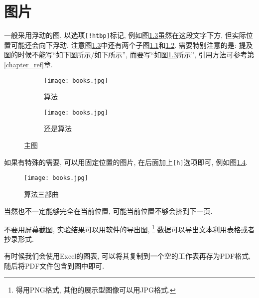\chapter{图片}

  一般采用浮动的图, 以选项\texttt{[!htbp]}标记, 例如图\ref{fig:algorithm}虽然在这段文字下方, 
但实际位置可能还会向下浮动. 注意图\ref{fig:algorithm}中还有两个子图\ref{fig:algorithm:a}和\ref{fig:algorithm:b}. 需要特别注意的是: 提及图的时候不能写``如下图所示/如下所示'', 
而要写``如图\ref{fig:algorithm}所示'', 引用方法可参考第\ref{chapter_ref}章.

\begin{figure}[!htbp]
\centering
\begin{subfigure}[t]{.3\textwidth}
  \centering
  \texttt{[image: books.jpg]}
  \caption{算法}
  \label{fig:algorithm:a}
\end{subfigure}
\quad
\begin{subfigure}[t]{.3\textwidth}
  \centering
  \texttt{[image: books.jpg]}
  \caption{还是算法}
  \label{fig:algorithm:b}
\end{subfigure}
\caption{主图}
\label{fig:algorithm}
\end{figure}


  如果有特殊的需要, 可以用固定位置的图片, 在后面加上\texttt{[h]}选项即可, 例如图\ref{fig:books}.

\begin{figure}[h]
    \centering
    \texttt{[image: books.jpg]}
    \caption{算法三部曲}
    \label{fig:books}
\end{figure}

  当然也不一定能够完全在当前位置, 可能当前位置不够会挤到下一页.

  不要用屏幕截图, 实验结果可以用软件的导出图,%
\footnote{得用PNG格式, 其他的展示型图像可以用JPG格式.}
数据可以导出文本利用表格或者抄录形式.

  有时候我们会使用Excel的图表, 可以将其复制到一个空的工作表再存为PDF格式,
随后将PDF文件包含到图中即可.
